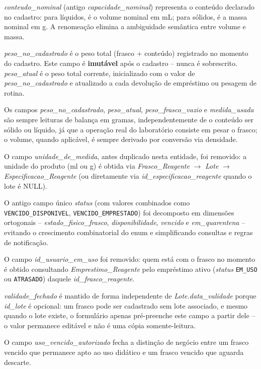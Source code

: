 \documentclass[12pt,a4paper]{article}
\begin{document}
\begin{explicacao}
\textit{conteudo\_nominal} (antigo \textit{capacidade\_nominal}) representa o conteúdo declarado no cadastro: para líquidos, é o volume nominal em mL; para sólidos, é a massa nominal em g. A renomeação elimina a ambiguidade semântica entre volume e massa.

\textit{peso\_no\_cadastrado} é o peso total (frasco + conteúdo) registrado no momento do cadastro. Este campo é \textbf{imutável} após o cadastro -- nunca é sobrescrito. \textit{peso\_atual} é o peso total corrente, inicializado com o valor de \textit{peso\_no\_cadastrado} e atualizado a cada devolução de empréstimo ou pesagem de rotina.

Os campos \textit{peso\_no\_cadastrado}, \textit{peso\_atual}, \textit{peso\_frasco\_vazio} e \textit{medida\_usada} são sempre leituras de balança em gramas, independentemente de o conteúdo ser sólido ou líquido, já que a operação real do laboratório consiste em pesar o frasco; o volume, quando aplicável, é sempre derivado por conversão via densidade.

O campo \textit{unidade\_de\_medida}, antes duplicado nesta entidade, foi removido: a unidade do produto (ml ou g) é obtida via \textit{Frasco\_Reagente} $\rightarrow$ \textit{Lote} $\rightarrow$ \textit{Especificacao\_Reagente} (ou diretamente via \textit{id\_especificacao\_reagente} quando o lote é NULL).

O antigo campo único \textit{status} (com valores combinados como \texttt{VENCIDO\_DISPONIVEL}, \texttt{VENCIDO\_EMPRESTADO}) foi decomposto em dimensões ortogonais -- \textit{estado\_fisico\_frasco}, \textit{disponibilidade}, \textit{vencido} e \textit{em\_quarentena} -- evitando o crescimento combinatorial do enum e simplificando consultas e regras de notificação.

O campo \textit{id\_usuario\_em\_uso} foi removido: quem está com o frasco no momento é obtido consultando \textit{Emprestimo\_Reagente} pelo empréstimo ativo (\textit{status} \texttt{EM\_USO} ou \texttt{ATRASADO}) daquele \textit{id\_frasco\_reagente}.

\textit{validade\_fechado} é mantido de forma independente de \textit{Lote.data\_validade} porque \textit{id\_lote} é opcional: um frasco pode ser cadastrado sem lote associado, e mesmo quando o lote existe, o formulário apenas pré-preenche este campo a partir dele -- o valor permanece editável e não é uma cópia somente-leitura.

O campo \textit{uso\_vencido\_autorizado} fecha a distinção de negócio entre um frasco vencido que permanece apto ao uso didático e um frasco vencido que aguarda descarte.
\end{explicacao}
\end{document}
